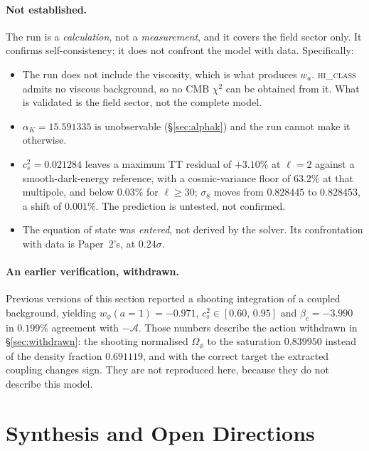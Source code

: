 \documentclass[12pt,a4paper]{article}
\newcommand{\AURA}{\mathcal{A}}
\newcommand{\bc}{\beta_c}
\begin{document}
\paragraph{Not established.}
The run is a \emph{calculation}, not a \emph{measurement}, and it covers
the field sector only.  It confirms self-consistency; it does not
confront the model with data.  Specifically:
\begin{itemize}
  \item The run does not include the viscosity, which is what produces
    $w_a$.  \textsc{hi\_class} admits no viscous background, so no CMB
    $\chi^2$ can be obtained from it.  What is validated is the field
    sector, not the complete model.
  \item $\alpha_K = 15.591335$ is unobservable (§\ref{sec:alphak}) and
    the run cannot make it otherwise.
  \item $c_s^2 = 0.021284$ leaves a maximum TT residual of $+3.10\%$ at
    $\ell = 2$ against a smooth-dark-energy reference, with a
    cosmic-variance floor of $63.2\%$ at that multipole, and below
    $0.03\%$ for $\ell \geq 30$; $\sigma_8$ moves from $0.828445$ to
    $0.828453$, a shift of $0.001\%$.  The prediction is untested, not
    confirmed.
  \item The equation of state was \emph{entered}, not derived by the
    solver.  Its confrontation with data is Paper~2's, at $0.24\sigma$.
\end{itemize}

\paragraph{An earlier verification, withdrawn.}
Previous versions of this section reported a shooting integration of a
coupled background, yielding $w_\phi(a{=}1)=-0.971$,
$c_s^2 \in [0.60,\,0.95]$ and $\bc = -3.990$ in $0.199\%$ agreement with
$-\AURA$.  Those numbers describe the action withdrawn in
§\ref{sec:withdrawn}: the shooting normalised $\Omega_\phi$ to the
saturation $0.839950$ instead of the density fraction $0.691119$, and
with the correct target the extracted coupling changes sign.  They are
not reproduced here, because they do not describe this model.
\section{Synthesis and Open Directions}
\label{sec:synthesis}
\end{document}
